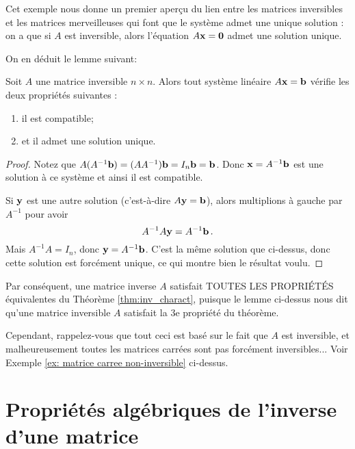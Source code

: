 Cet exemple nous donne un premier aperçu du lien entre les matrices inversibles et les matrices merveilleuses qui font que le système admet une unique solution :
 on a que si $A$ est inversible, alors l'équation $A \mathbf{x} = \mathbf{0}$ admet une solution unique.


On en déduit le lemme suivant:


\begin{lemma}  \label{lem: Matrice inversible et système lineaire}
Soit $A$ une matrice inversible $n\times n$.  Alors tout système linéaire $A\mathbf{x} = \mathbf{b}$  vérifie les deux propriétés suivantes :
\begin{enumerate}
\item il est compatible;
\item et il admet une solution unique.
\end{enumerate}
\end{lemma}

\begin{proof}
Notez que $A(A^{-1}\mathbf{b}) = (AA^{-1})\mathbf{b} = I_n \mathbf{b} = \mathbf{b}$.
Donc $\mathbf{x} = A^{-1}\mathbf{b}$ est une solution \`a ce système et ainsi il est compatible.

Si $\mathbf{y}$ est une autre solution (c'est-à-dire $A \mathbf{y} = \mathbf{b}$), alors
multiplions à gauche par $A^{-1}$ pour avoir
$$
A^{-1}A\mathbf{y} = A^{-1}\mathbf{b}\,.
$$
Mais $A^{-1}A = I_n$, donc $\mathbf{y} = A^{-1}\mathbf{b}$. C'est la même solution que ci-dessus, donc cette solution est forcément unique, ce qui montre bien le résultat voulu.
\end{proof}

Par conséquent, une matrice inverse $A$ satisfait TOUTES LES PROPRIÉTÉS équivalentes du 
Théorème \ref{thm:inv_charact}, puisque le lemme ci-dessus nous dit qu'une matrice inversible $A$ satisfait la 3e propriété du théorème.

Cependant, rappelez-vous que tout ceci est basé sur le fait que $A$ est inversible, et malheureusement toutes les matrices carrées sont pas forcément inversibles... Voir Exemple \ref{ex: matrice carree non-inversible} ci-dessus.


\section{Propriétés algébriques de l'inverse d'une matrice}

